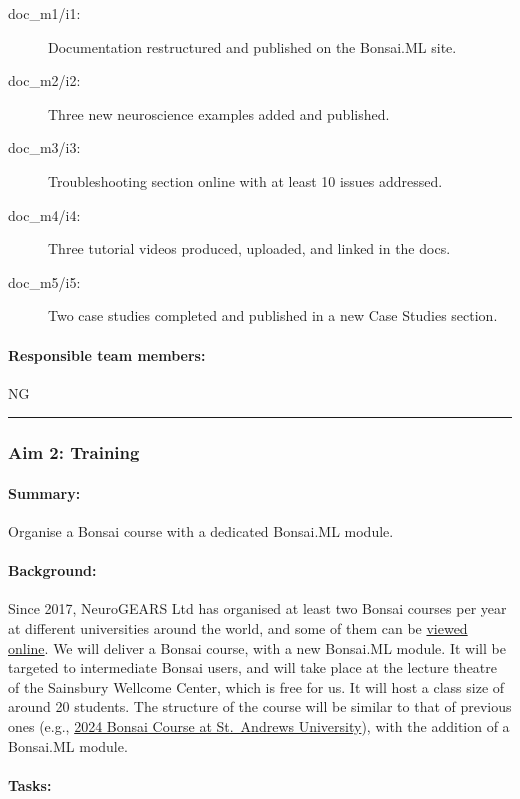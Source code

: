 \begin{description}
    \item[doc\_m1/i1:] Documentation restructured and published on the Bonsai.ML site.  
    \item[doc\_m2/i2:] Three new neuroscience examples added and published.  
    \item[doc\_m3/i3:] Troubleshooting section online with at least 10 issues addressed.  
    \item[doc\_m4/i4:] Three tutorial videos produced, uploaded, and linked in the docs.  
    \item[doc\_m5/i5:] Two case studies completed and published in a new Case Studies section.  
\end{description}

\paragraph{Responsible team members:} NG

\noindent\rule{\textwidth}{1pt}
\subsubsection{Aim 2: Training}
\paragraph{Summary:} Organise a Bonsai course with a dedicated Bonsai.ML module.

\paragraph{Background:} Since 2017, NeuroGEARS Ltd has organised at least two
Bonsai courses per year at different universities around the world, and some of
them can be \href{https://bonsai-rx.org/learn/}{viewed online}.
%
We will deliver a Bonsai course, with a new Bonsai.ML module. It will be
targeted to intermediate Bonsai users, and will take place at the lecture
theatre of the Sainsbury Wellcome Center, which is free for us. It will host a
class size of around 20 students. The structure of the course will be similar
to that of previous ones (e.g.,
\href{https://neurogears.org/st-andrews-2024/}{2024 Bonsai Course at
St.~Andrews University}), with the addition of a Bonsai.ML module.

\paragraph{Tasks:}  

